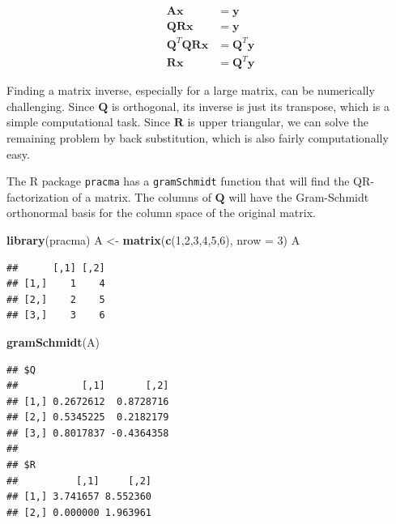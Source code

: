 \documentclass[
]{book}
\newenvironment{Shaded}{\begin{snugshade}}{\end{snugshade}}
\newcommand{\AttributeTok}[1]{\textcolor[rgb]{0.13,0.29,0.53}{#1}}
\newcommand{\DecValTok}[1]{\textcolor[rgb]{0.00,0.00,0.81}{#1}}
\newcommand{\FunctionTok}[1]{\textcolor[rgb]{0.13,0.29,0.53}{\textbf{#1}}}
\newcommand{\NormalTok}[1]{#1}
\newcommand{\OtherTok}[1]{\textcolor[rgb]{0.56,0.35,0.01}{#1}}
\theoremstyle{definition}
\theoremstyle{definition}
\theoremstyle{definition}
\theoremstyle{definition}
\theoremstyle{remark}
\begin{document}
\begin{align*}
\mathbf{A}\mathbf{x}&=\mathbf{y}\\
\mathbf{Q}\mathbf{R}\mathbf{x}&=\mathbf{y}\\
\mathbf{Q}^T\mathbf{Q}\mathbf{R}\mathbf{x}&=\mathbf{Q}^T\mathbf{y}\\
\mathbf{R}\mathbf{x}&=\mathbf{Q}^T\mathbf{y}
\end{align*}

Finding a matrix inverse, especially for a large matrix, can be numerically challenging. Since \(\mathbf{Q}\) is orthogonal, its inverse is just its transpose, which is a simple computational task. Since \(\mathbf{R}\) is upper triangular, we can solve the remaining problem by back substitution, which is also fairly computationally easy.

The R package \texttt{pracma} has a \texttt{gramSchmidt} function that will find the QR-factorization of a matrix. The columns of \(\mathbf{Q}\) will have the Gram-Schmidt orthonormal basis for the column space of the original matrix.

\begin{Shaded}
\begin{Highlighting}[]
\FunctionTok{library}\NormalTok{(pracma)}
\NormalTok{A }\OtherTok{\textless{}{-}} \FunctionTok{matrix}\NormalTok{(}\FunctionTok{c}\NormalTok{(}\DecValTok{1}\NormalTok{,}\DecValTok{2}\NormalTok{,}\DecValTok{3}\NormalTok{,}\DecValTok{4}\NormalTok{,}\DecValTok{5}\NormalTok{,}\DecValTok{6}\NormalTok{), }\AttributeTok{nrow =} \DecValTok{3}\NormalTok{)}
\NormalTok{A}
\end{Highlighting}
\end{Shaded}

\begin{verbatim}
##      [,1] [,2]
## [1,]    1    4
## [2,]    2    5
## [3,]    3    6
\end{verbatim}

\begin{Shaded}
\begin{Highlighting}[]
\FunctionTok{gramSchmidt}\NormalTok{(A)}
\end{Highlighting}
\end{Shaded}

\begin{verbatim}
## $Q
##           [,1]       [,2]
## [1,] 0.2672612  0.8728716
## [2,] 0.5345225  0.2182179
## [3,] 0.8017837 -0.4364358
## 
## $R
##          [,1]     [,2]
## [1,] 3.741657 8.552360
## [2,] 0.000000 1.963961
\end{verbatim}
\end{document}

